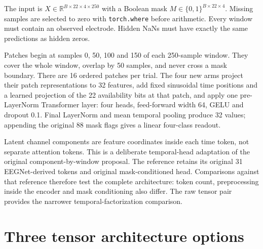 \documentclass[11pt,a4paper]{article}
\newcommand{\code}[1]{{\small\nolinkurl{#1}}}
\begin{document}
The input is $X\in\mathbb{R}^{B\times22\times4\times250}$ with a Boolean
mask $M\in\{0,1\}^{B\times22\times4}$. Missing samples are selected to zero
with \code{torch.where} before arithmetic. Every window must contain an observed
electrode. Hidden NaNs must have exactly the same predictions as hidden zeros.

\begin{center}
\end{center}

Patches begin at samples 0, 50, 100 and 150 of each 250-sample window. They cover
the whole window, overlap by 50 samples, and never cross a mask boundary.
There are 16 ordered patches per trial. The four new arms project their patch
representations to 32 features, add fixed sinusoidal time positions and a
learned projection of the 22 availability bits at that patch, and apply one
pre-LayerNorm Transformer layer: four heads, feed-forward width 64, GELU and
dropout 0.1. Final LayerNorm and mean temporal pooling produce 32 values;
appending the original 88 mask flags gives a linear four-class readout.

Latent channel components are feature coordinates inside each time token, not
separate attention tokens. This is a deliberate temporal-head adaptation of
the original component-by-window proposal. The reference retains its original
31 EEGNet-derived tokens and original mask-conditioned head.
Comparisons against that reference therefore test the complete architecture:
token count, preprocessing inside the encoder and mask conditioning also differ.
The raw tensor pair provides the narrower temporal-factorization comparison.

\section{Three tensor architecture options}
\end{document}
